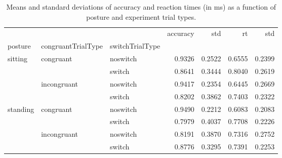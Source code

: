 \begin{table}
\centering
\caption{Means and standard deviations of accuracy and reaction times (in ms) as a function of posture and experiment trial types.}
\label{table-task-switching-replication-reaction-time}
\begin{tabular}{lllrrrr}
\toprule
         &             &        & accuracy &    std &     rt &    std \\
posture & congruantTrialType & switchTrialType &          &        &        &        \\
\midrule
sitting & congruant & noswitch &   0.9326 & 0.2522 & 0.6555 & 0.2399 \\
         &             & switch &   0.8641 & 0.3444 & 0.8040 & 0.2619 \\
         & incongruant & noswitch &   0.9417 & 0.2354 & 0.6445 & 0.2669 \\
         &             & switch &   0.8202 & 0.3862 & 0.7403 & 0.2322 \\
standing & congruant & noswitch &   0.9490 & 0.2212 & 0.6083 & 0.2083 \\
         &             & switch &   0.7979 & 0.4037 & 0.7708 & 0.2226 \\
         & incongruant & noswitch &   0.8191 & 0.3870 & 0.7316 & 0.2752 \\
         &             & switch &   0.8776 & 0.3295 & 0.7391 & 0.2253 \\
\bottomrule
\end{tabular}
\end{table}
